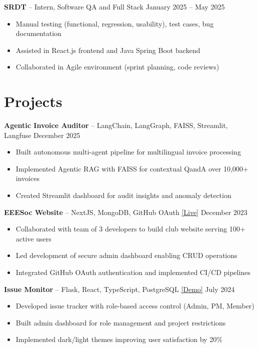 \documentclass[letterpaper,10pt]{article}
\begin{document}
\textbf{SRDT} -- Intern, Software QA and Full Stack \hfill January 2025 -- May 2025
\begin{itemize}
  \item Manual testing (functional, regression, usability), test cases, bug documentation
  \item Assisted in React.js frontend and Java Spring Boot backend
  \item Collaborated in Agile environment (sprint planning, code reviews)
\end{itemize}

\section{Projects}
\textbf{Agentic Invoice Auditor} -- LangChain, LangGraph, FAISS, Streamlit, Langfuse \hfill December 2025
\begin{itemize}
  \item Built autonomous multi-agent pipeline for multilingual invoice processing
  \item Implemented Agentic RAG with FAISS for contextual QandA over 10,000+ invoices
  \item Created Streamlit dashboard for audit insights and anomaly detection
\end{itemize}

\textbf{EEESoc Website} -- NextJS, MongoDB, GitHub OAuth \href{https://eeesocbit.com/}{\underline{[Live]}} \hfill December 2023
\begin{itemize}
  \item Collaborated with team of 3 developers to build club website serving 100+ active users
  \item Led development of secure admin dashboard enabling CRUD operations
  \item Integrated GitHub OAuth authentication and implemented CI/CD pipelines
\end{itemize}

\textbf{Issue Monitor} -- Flask, React, TypeScript, PostgreSQL \href{https://issue-monitor-frontend.vercel.app}{\underline{[Demo]}} \hfill July 2024
\begin{itemize}
  \item Developed issue tracker with role-based access control (Admin, PM, Member)
  \item Built admin dashboard for role management and project restrictions
  \item Implemented dark/light themes improving user satisfaction by 20\%
\end{itemize}
\end{document}
